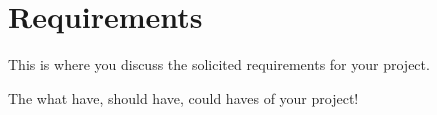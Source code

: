 \label{part:requirements}

\chapter{Requirements}
\label{chap:requirements}
\onehalfspacing

This is where you discuss the solicited requirements for your project.

The what have, should have, could haves of your project!